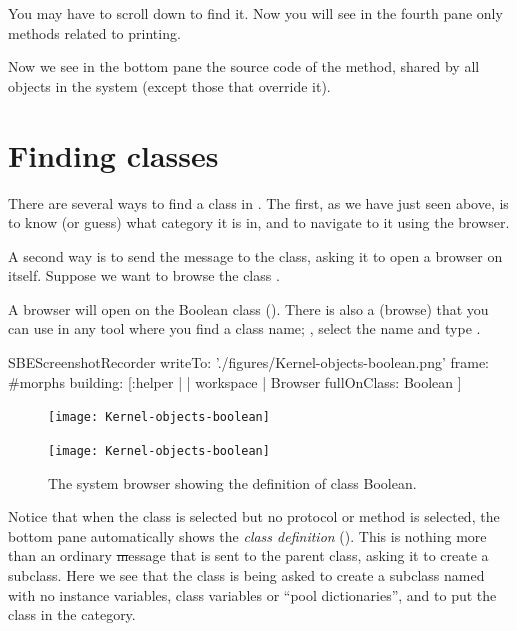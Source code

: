 \documentclass[a4paper,10pt,twoside]{book}
\begin{document}
You may have to scroll down to find it.
Now you will see in the fourth pane only methods related to printing.

Now we see in the bottom pane the source code of the  method, shared by all objects in the system (except those that override it).

\section{Finding classes}

There are several ways to find a class in \sq.
The first, as we have just seen above, is to know (or guess) what category it is in, and to navigate to it using the browser.

A second way is to send the  message to the class, asking it to open a browser on itself.
Suppose we want to browse the class .

A browser will open on the Boolean class ().
There is also a   (browse) that you can use in any tool where you find a class name; , select the name and type .


\begin{ExecuteSmalltalkScript}
SBEScreenshotRecorder writeTo: './figures/Kernel-objects-boolean.png' frame: #morphs building: [:helper | | workspace |
  Browser fullOnClass: Boolean
]
\end{ExecuteSmalltalkScript}
\begin{figure}[hbt]
\ifluluelse
	{\centerline {\texttt{[image: Kernel-objects-boolean]}}}
	{\centerline {\texttt{[image: Kernel-objects-boolean]}}}
\caption{The system browser showing the definition of class Boolean.
\label{fig:browseBoolean}}
\end{figure}

Notice that when the  class is selected but no protocol or method is selected, the bottom pane automatically shows the \emph{class definition}
().
This is nothing more than an ordinary \st message that is sent to the parent class, asking it to create a subclass.
Here we see that the class  is being asked to create a subclass named  with no instance variables, class variables or ``pool dictionaries'', and to put the class  in the  category.
\end{document}
